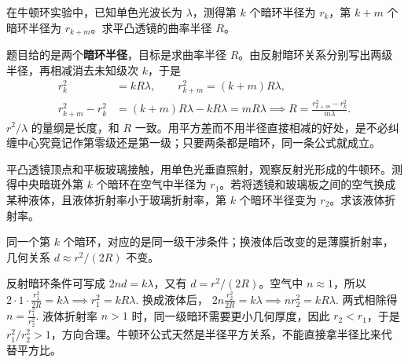 \documentclass[lang=cn,11pt]{elegantbook}
\begin{document}
\begin{exercise}[牛顿环测曲率半径]
在牛顿环实验中，已知单色光波长为 \(\lambda\)，测得第 \(k\) 个暗环半径为 \(r_k\)，第 \(k+m\) 个暗环半径为 \(r_{k+m}\)。求平凸透镜的曲率半径 \(R\)。
\end{exercise}

\begin{solution}
题目给的是两个\textbf{暗环半径}，目标是求曲率半径 \(R\)。由反射暗环关系分别写出两级半径，再相减消去未知级次 \(k\)，于是
\[
\begin{aligned}
r_k^2&=kR\lambda,\qquad r_{k+m}^2=(k+m)R\lambda,\\
r_{k+m}^2-r_k^2&=(k+m)R\lambda-kR\lambda=mR\lambda
\implies
R=\frac{r_{k+m}^2-r_k^2}{m\lambda}.
\end{aligned}
\]
\(r^2/\lambda\) 的量纲是长度，和 \(R\) 一致。用平方差而不用半径直接相减的好处，是不必纠缠中心究竟记作第零级还是第一级；只要两条都是暗环，同一条公式就成立。
\end{solution}

\begin{exercise}[空气换成液体后牛顿环半径怎样反推折射率]
平凸透镜顶点和平板玻璃接触，用单色光垂直照射，观察反射光形成的牛顿环。测得中央暗斑外第 \(k\) 个暗环在空气中半径为 \(r_1\)。若将透镜和玻璃板之间的空气换成某种液体，且液体折射率小于玻璃折射率，第 \(k\) 个暗环半径变为 \(r_2\)。求该液体折射率。
\end{exercise}

\begin{solution}
同一个第 \(k\) 个暗环，对应的是同一级干涉条件；换液体后改变的是薄膜折射率，几何关系 \(d\approx r^2/(2R)\) 不变。

反射暗环条件可写成 \(2nd=k\lambda\)，又有 \(d=r^2/(2R)\)。空气中 \(n\approx1\)，所以
 \(2\cdot 1\cdot \frac{r_1^2}{2R}=k\lambda \implies r_1^2=kR\lambda.\) 
换成液体后，
 \(2n\frac{r_2^2}{2R}=k\lambda \implies nr_2^2=kR\lambda.\) 
两式相除得
 \(n=\frac{r_1^2}{r_2^2}.\) 
液体折射率 \(n>1\) 时，同一级暗环需要更小几何厚度，因此 \(r_2<r_1\)，于是 \(r_1^2/r_2^2>1\)，方向合理。牛顿环公式天然是半径平方关系，不能直接拿半径比来代替平方比。
\end{solution}
\end{document}
